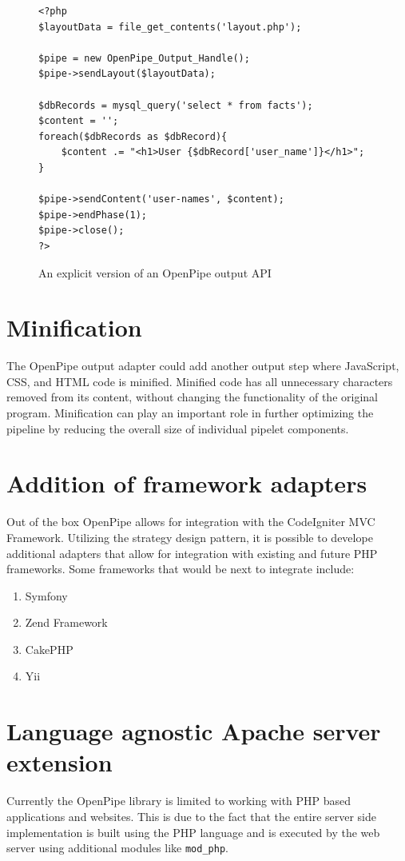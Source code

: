 \documentclass[12pt]{report}
\begin{document}
\begin{figure}[H]
\begin{lstlisting}
<?php
$layoutData = file_get_contents('layout.php');

$pipe = new OpenPipe_Output_Handle();
$pipe->sendLayout($layoutData);

$dbRecords = mysql_query('select * from facts');
$content = '';
foreach($dbRecords as $dbRecord){
	$content .= "<h1>User {$dbRecord['user_name']}</h1>";
}

$pipe->sendContent('user-names', $content);
$pipe->endPhase(1);
$pipe->close();
?>
\end{lstlisting}
\caption{An explicit version of an OpenPipe output API}
\label{fig:explicitApi}
\end{figure}

\section{Minification}
The OpenPipe output adapter could add another output step where JavaScript, CSS, and HTML code is minified. Minified code has all unnecessary characters removed from its content, without changing the functionality of the original program. Minification can play an important role in further optimizing the pipeline by reducing the overall size of individual pipelet components.

\section{Addition of framework adapters}
Out of the box OpenPipe allows for integration with the CodeIgniter MVC Framework. Utilizing the strategy design pattern, it is possible to develope additional adapters that allow for integration with existing and future PHP frameworks. Some frameworks that would be next to integrate include:

\begin{enumerate}
	\item Symfony
	\item Zend Framework
	\item CakePHP
	\item Yii
\end{enumerate}

\section{Language agnostic Apache server extension}
Currently the OpenPipe library is limited to working with PHP based applications and websites. This is due to the fact that the entire server side implementation is built  using the PHP language and is executed by the web server using additional modules like \texttt{mod\_php}. 
\end{document}
